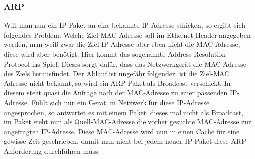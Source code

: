 \documentclass[a4paper,14pt,headsepline]{scrartcl}
\begin{document}
\subsubsection{ARP}
Will man nun ein IP-Paket an eine bekannte IP-Adresse schicken, so ergibt sich folgendes Problem. Welche Ziel-MAC-Adresse soll im Ethernet Header angegeben werden, man weiß zwar die Ziel-IP-Adresse aber eben nicht die MAC-Adresse, diese wird aber benötigt. Hier kommt das sogenannte Address-Resolution-Protocol ins Spiel. Dieses sorgt dafür, dass das Netzwerkgerät die MAC-Adresse des Ziels herausfindet. Der Ablauf ist ungefähr folgender: ist die Ziel-MAC Adresse nicht bekannt, so wird ein ARP-Paket als Broadcast verschickt. In diesem steht quasi die Anfrage nach der MAC-Adresse zu einer passenden IP-Adresse. Fühlt sich nun ein Gerät im Netzwerk für diese IP-Adresse angesprochen, so antwortet es mit einem Paket, dieses mal nicht als Broadcast, im Paket steht nun als Quell-MAC-Adresse die vorher gesuchte MAC-Adresse zur angefragten IP-Adresse. Diese MAC-Adresse wird nun in einen Cache für eine gewisse Zeit geschrieben, damit man nicht bei jedem neuen IP-Paket diese ARP-Anforderung durchführen muss.

\newpage
\end{document}
